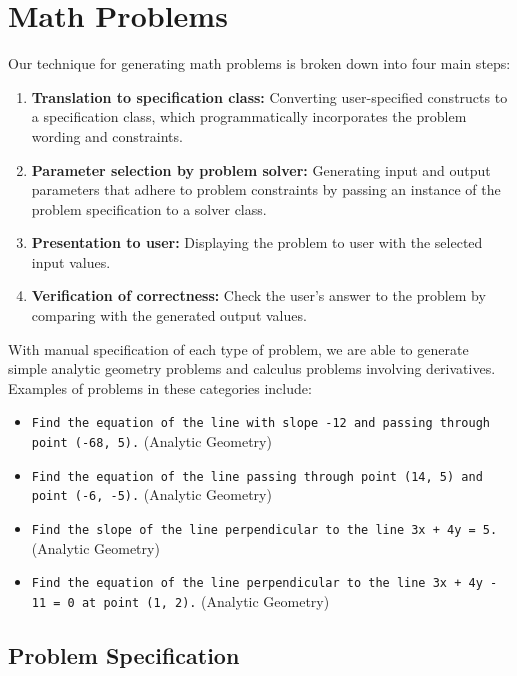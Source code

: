 \section{Math Problems} \label{sec:math}

Our technique for generating math problems is broken down into four main steps: 
\begin{singlespace}
\begin{enumerate}
\item \textbf{Translation to specification class:} Converting user-specified constructs to a specification class, which programmatically incorporates the problem wording and constraints.
\item \textbf{Parameter selection by problem solver:} Generating input and output parameters that adhere to problem constraints by passing an instance of the problem specification to a solver class. 
\item \textbf{Presentation to user:} Displaying the problem to user with the selected input values.
\item \textbf{Verification of correctness:} Check the user's answer to the problem by comparing with the generated output values.
\end{enumerate}
\end{singlespace}
With manual specification of each type of problem, we are able to generate simple analytic geometry problems and calculus problems involving derivatives. Examples of problems in these categories include:

\begin{singlespace}
\begin{itemize}
\item \texttt{Find the equation of the line with slope -12 and passing through point (-68, 5).} (Analytic Geometry)
\item \texttt{Find the equation of the line passing through point (14, 5) and point (-6, -5).} (Analytic Geometry)
\item \texttt{Find the slope of the line perpendicular to the line 3x + 4y = 5.} (Analytic Geometry)
\item \texttt{Find the equation of the line perpendicular to the line 3x + 4y - 11 = 0 at point (1, 2).} (Analytic Geometry)
\end{itemize}
\end{singlespace}

\subsection{Problem Specification}

